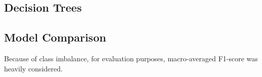 \subsection{Decision Trees}




\subsection{Model Comparison}
Because of class imbalance, for evaluation purposes,
macro-averaged F1-score was heavily considered.